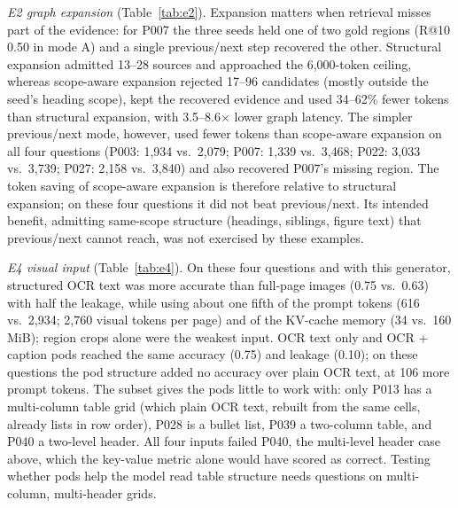 \documentclass[runningheads]{llncs}
\begin{document}
\emph{E2 graph expansion} (Table~\ref{tab:e2}). Expansion matters when retrieval misses part of the evidence: for P007 the three seeds held one of two gold regions (R@10 0.50 in mode A) and a single previous/next step recovered the other. Structural expansion admitted 13--28 sources and approached the 6{,}000-token ceiling, whereas scope-aware expansion rejected 17--96 candidates (mostly outside the seed's heading scope), kept the recovered evidence and used 34--62\% fewer tokens than structural expansion, with 3.5--8.6$\times$ lower graph latency. The simpler previous/next mode, however, used fewer tokens than scope-aware expansion on all four questions (P003: 1{,}934 vs.\ 2{,}079; P007: 1{,}339 vs.\ 3{,}468; P022: 3{,}033 vs.\ 3{,}739; P027: 2{,}158 vs.\ 3{,}840) and also recovered P007's missing region. The token saving of scope-aware expansion is therefore relative to structural expansion; on these four questions it did not beat previous/next. Its intended benefit, admitting same-scope structure (headings, siblings, figure text) that previous/next cannot reach, was not exercised by these examples.

\emph{E4 visual input} (Table~\ref{tab:e4}). On these four questions and with this generator, structured OCR text was more accurate than full-page images (0.75 vs.\ 0.63) with half the leakage, while using about one fifth of the prompt tokens (616 vs.\ 2{,}934; 2{,}760 visual tokens per page) and of the KV-cache memory (34 vs.\ 160\,MiB); region crops alone were the weakest input. OCR text only and OCR + caption pods reached the same accuracy (0.75) and leakage (0.10); on these questions the pod structure added no accuracy over plain OCR text, at 106 more prompt tokens. The subset gives the pods little to work with: only P013 has a multi-column table grid (which plain OCR text, rebuilt from the same cells, already lists in row order), P028 is a bullet list, P039 a two-column table, and P040 a two-level header. All four inputs failed P040, the multi-level header case above, which the key-value metric alone would have scored as correct. Testing whether pods help the model read table structure needs questions on multi-column, multi-header grids.
\end{document}
